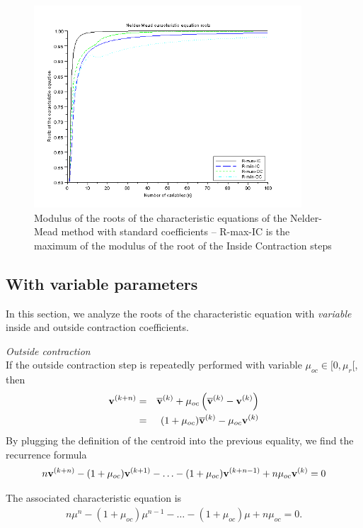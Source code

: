 \begin{figure}
\begin{center}
\includegraphics[width=10cm]{neldermead-roots.png}
\end{center}
\caption{Modulus of the roots of the characteristic equations of the Nelder-Mead method with standard 
coefficients -- R-max-IC is the maximum of the modulus of the root of the Inside Contraction steps}
\label{fig-nm-roots}
\end{figure}

\subsection{With variable parameters}

In this section, we analyze the roots of the characteristic 
equation with \emph{variable} inside and outside contraction
coefficients.

\emph{Outside contraction} \\
If the outside contraction step is repeatedly performed
with variable $\mu_{oc} \in [0,\mu_r[$, then 
\begin{eqnarray}
\mathbf{v}^{(k+n)} &=& \overline{\bold{v}}^{(k)} 
+ \mu_{oc} \left( \overline{\bold{v}}^{(k)} - \mathbf{v}^{(k)}\right) \\
&=& (1 + \mu_{oc} ) \overline{\bold{v}}^{(k)} - \mu_{oc} \mathbf{v}^{(k)}
\end{eqnarray}
By plugging the definition of the centroid into the previous equality, we 
find the recurrence formula
\begin{eqnarray}
n \mathbf{v}^{(k+n)} - (1 + \mu_{oc} ) \mathbf{v}^{(k+1)} - \ldots - (1 + \mu_{oc} ) \mathbf{v}^{(k+n-1)} + n\mu_{oc}\mathbf{v}^{(k)} = 0
\end{eqnarray}

The associated characteristic equation is 
\begin{eqnarray}
\label{recurrence-variable}
n \mu^n - (1 + \mu_{oc} ) \mu^{n-1} - \ldots - (1 + \mu_{oc} ) \mu + n \mu_{oc} = 0.
\end{eqnarray}

